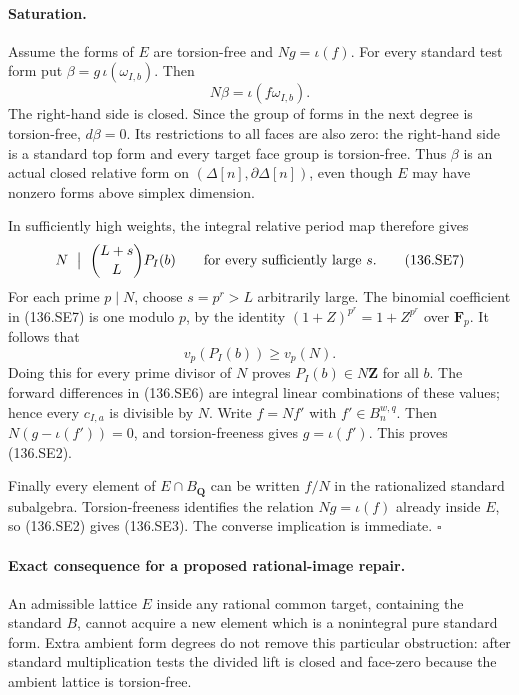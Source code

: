 \paragraph{Saturation.}
Assume the forms of \(E\) are torsion-free and
\(Ng=\iota(f)\). For every standard test form put
\(\beta=g\,\iota(\omega_{I,b})\). Then
\[
                        N\beta=\iota(f\omega_{I,b}).
 \]
The right-hand side is closed. Since the group of
forms in the next degree is torsion-free,
\(d\beta=0\). Its restrictions to all faces are also
zero: the right-hand side is a standard top form and
every target face group is torsion-free. Thus \(\beta\)
is an actual closed relative form on
\((\Delta[n],\partial\Delta[n])\), even though \(E\)
may have nonzero forms above simplex dimension.

In sufficiently high weights, the integral relative
period map therefore gives
\[
                     N\ \bigm|\ \binom{L+s}{L}P_I(b)
                  \qquad\hbox{for every sufficiently large }s.
 \tag{136.SE7}
\]
For each prime \(p\mid N\), choose \(s=p^r>L\)
arbitrarily large. The binomial coefficient in
(136.SE7) is one modulo \(p\), by the identity
\((1+Z)^{p^r}=1+Z^{p^r}\) over \(\mathbf F_p\).
It follows that
\[
                v_p(P_I(b))\geq v_p(N).
 \]
Doing this for every prime divisor of \(N\) proves
\(P_I(b)\in N\mathbf Z\) for all \(b\).
The forward differences in (136.SE6) are integral
linear combinations of these values; hence every
\(c_{I,a}\) is divisible by \(N\).
Write \(f=Nf'\) with \(f'\in B_n^{w,q}\).
Then \(N(g-\iota(f'))=0\), and torsion-freeness gives
\(g=\iota(f')\). This proves (136.SE2).

Finally every element of \(E\cap B_{\mathbf Q}\) can
be written \(f/N\) in the rationalized standard
subalgebra. Torsion-freeness identifies the relation
\(Ng=\iota(f)\) already inside \(E\), so (136.SE2)
gives (136.SE3). The converse implication is immediate.
\hfill\(\square\)

\paragraph{Exact consequence for a proposed rational-image repair.}
An admissible lattice \(E\) inside any rational common
target, containing the standard \(B\), cannot acquire
a new element which is a nonintegral pure standard
form. Extra ambient form degrees do not remove this
particular obstruction: after standard multiplication
tests the divided lift is closed and face-zero
because the ambient lattice is torsion-free.

